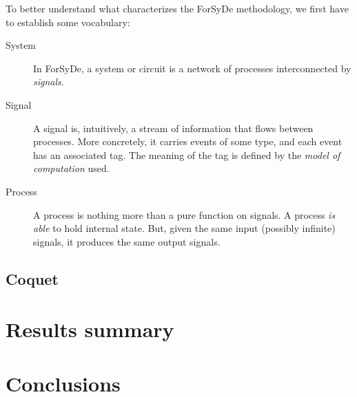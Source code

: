 \documentclass[a4paper]{article}
\begin{document}
            To better understand what characterizes the ForSyDe methodology, we first have to
            establish some vocabulary:
            \begin{description}
                \item[System] In ForSyDe, a system or circuit is a network of processes
                    interconnected by \emph{signals}.
                \item[Signal] A signal is, intuitively, a stream of information that flows between
                    processes. More concretely, it carries events of some type, and each event has
                    an associated tag. The meaning of the tag is defined by the \emph{model of
                        computation} used.
                \item[Process] A process is nothing more than a pure function on signals. A process
                    \emph{is able} to hold internal state. But, given the same input (possibly
                    infinite) signals, it produces the same output signals.
            \end{description}




        \subsection{Coquet}
        \label{subsec:coquet}


    \section{Results summary}
    \label{sec:results}

    \section{Conclusions}
    \label{sec:conclusions}


    
    
\end{document}
